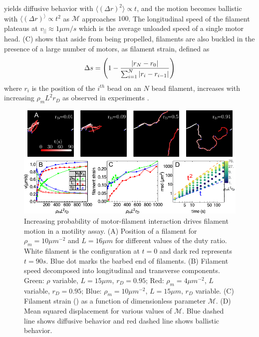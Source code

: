 \documentclass[12pt]{article}
\begin{document}
yields diffusive behavior with $\langle (\Delta r)^2 \rangle \propto t$, and the
motion becomes ballistic with $\langle (\Delta r)^ \rangle\propto t^2$ as $\mathcal{M}$ 
approaches $100$. The longitudinal speed of the filament plateaus at
$v_{||}\approx 1\mu m/s$ which is the average unloaded speed of a single motor 
head\cite{kron1986}. (C) shows that aside from being
propelled, filaments are also buckled in the presence of a large number of
motors, as filament strain, defined as
\begin{equation} 
  \Delta s = \left(1 - {|r_N-r_0|\over\sum_{i=1}^N{|r_i-r_{i-1}|}}\right) 
  \label{eqn:fil_strain}
\end{equation} 
where $r_i$ is the position of the $i^{th}$ bead on an $N$ bead filament, increases with 
increasing $\rho_m L^2 r_D$ as observed in experiments \cite{schaller2010}.
\begin{figure}[H] 
    \centering
    \includegraphics[scale=1.2]{figs/mot_fig.pdf}
  \caption{%
  \label{fig:motility}%
  Increasing probability of motor-filament interaction drives filament motion in a motility assay. 
  (A) Position of a filament for $\rho_m = 10\mu m^{-2}$ and $L = 16\mu m$ for
  different values of the duty ratio. White filament is the configuration at
  $t=0$ and dark red represents $t=90s$. Blue dot marks the barbed end of
  filaments.  
  (B) Filament speed decomposed into longitudinal and transverse components. 
  Green: $\rho$ variable, $L=15\mu m$, $r_D=0.95$; Red:
  $\rho_m=4\mu m^{-2}$, $L$ variable, $r_D=0.95$; Blue: $\rho_m = 10\mu m^{-2}$,
  $L=15\mu m$, $r_D$ variable.  
  (C) Filament strain () as a function of
  dimensionless parameter $\mathcal{M}$.
  (D) Mean squared displacement for various values of $\mathcal{M}$. Blue dashed 
  line shows diffusive behavior and red dashed line shows ballistic behavior.
 }
\end{figure}
\end{document}
